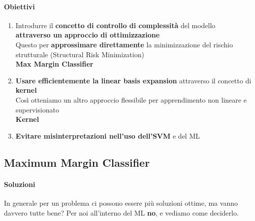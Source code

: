 \documentclass[10pt]{book}
\begin{document}
\paragraph{Obiettivi} \begin{enumerate}
	\item Introdurre il \textbf{concetto di controllo di complessità} del modello \textbf{attraverso un approccio di ottimizzazione}\\
	Questo per \textbf{approssimare direttamente} la minimizzazione del rischio strutturale (Structural Risk Minimization)\\
	\textbf{Max Margin Classifier}
	\item \textbf{Usare efficientemente la linear basis expansion} attraverso il concetto di \textbf{kernel}\\
	Così otteniamo un altro approccio flessibile per apprendimento non lineare e supervisionato\\
	\textbf{Kernel}
	\item \textbf{Evitare misinterpretazioni nell'uso dell'SVM} e del ML
\end{enumerate}
\subsection{Maximum Margin Classifier}
\paragraph{Soluzioni} In generale per un problema ci possono essere più soluzioni ottime, ma vanno davvero tutte bene? Per noi all'interno del ML \textbf{no}, e vediamo come deciderlo.
\pagebreak
\end{document}
